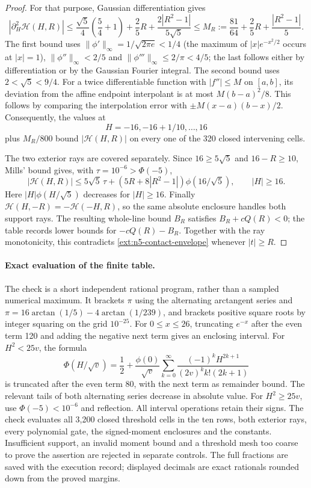 \begin{proof}
For that purpose, Gaussian differentiation gives
\[
 |\partial_H^2\mathcal H(H,R)|
 \le\frac{\sqrt5}{4}\left(\frac54+1\right)
       +\frac25R+\frac{2|R^2-1|}{5\sqrt5}
 \le M_R:=\frac{81}{64}+\frac25R+\frac{|R^2-1|}{5}.
\]
The first bound uses $\|\phi'\|_\infty=1/\sqrt{2\pi e}<1/4$
(the maximum of $|x|e^{-x^2/2}$ occurs at $|x|=1$),
$\|\phi''\|_\infty<2/5$ and
$\|\phi'''\|_\infty\le2/\pi<4/5$; the last follows either
by differentiation or by the Gaussian Fourier integral. The second
bound uses $2<\sqrt5<9/4$.
For a twice differentiable function with $|f''|\le M$ on $[a,b]$,
its deviation from the affine endpoint interpolant is at most
$M(b-a)^2/8$. This follows by comparing the interpolation error
with $\pm M(x-a)(b-x)/2$. Consequently, the values at
\[
 H=-16,-16+1/10,\ldots,16
\]
plus $M_R/800$ bound $|\mathcal H(H,R)|$ on every one of the
320 closed intervening cells.

The two exterior rays are covered separately. Since $16\ge5\sqrt5$
and $16-R\ge10$, Mills' bound gives, with $\tau=10^{-6}>\Phi(-5)$,
\[
 |\mathcal H(H,R)|\le5\sqrt5\,\tau+
 \left(5R+8|R^2-1|\right)\phi(16/\sqrt5),\qquad |H|\ge16.
\]
Here $|H|\phi(H/\sqrt5)$ decreases for $|H|\ge16$.
Finally $\mathcal H(H,-R)=-\mathcal H(-H,R)$, so the same
absolute enclosure handles both support rays.
The resulting whole-line bound $B_R$ satisfies
$B_R+cQ(R)<0$; the table records lower bounds for $-cQ(R)-B_R$.
Together with the ray monotonicity, this contradicts
\eqref{ext:n5-contact-envelope} whenever $|t|\ge R$.
\end{proof}

\paragraph{Exact evaluation of the finite table.}
The check is a short independent rational program, rather than a sampled
numerical maximum. It brackets $\pi$ using the alternating arctangent
series and $\pi=16\arctan(1/5)-4\arctan(1/239)$, and brackets positive
square roots by integer squaring on the grid $10^{-25}$.
For $0\le x\le26$, truncating $e^{-x}$ after the even term 120 and
adding the negative next term gives an enclosing interval. For
$H^2<25v$, the formula
\[
 \Phi(H/\sqrt v)=\frac12+
 \frac{\phi(0)}{\sqrt v}
 \sum_{k=0}^{\infty}
 \frac{(-1)^kH^{2k+1}}{(2v)^k k!(2k+1)}
\]
is truncated after the even term 80, with the next term as remainder
bound. The relevant tails of both alternating series decrease in absolute
value. For $H^2\ge25v$, use $\Phi(-5)<10^{-6}$ and reflection.
All interval operations retain their signs. The check evaluates all 3,200
closed threshold cells in the ten rows, both exterior rays, every
polynomial gate, the signed-moment enclosures and the constants.
Insufficient support, an invalid moment bound and a threshold mesh too
coarse to prove the assertion are rejected in separate controls.
The full fractions are saved with the execution record; displayed decimals
are exact rationals rounded down from the proved margins.

